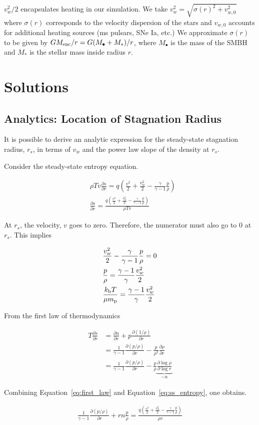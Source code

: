\documentclass[usenatbib,fleqn]{mn2e}
\newcommand{\rs}{r_s}
\newcommand{\dxdy}[2]{\frac{\partial #1}{\partial #2} }
\newcommand{\ddr}[1]{\dxdy{#1}{r}}
\newcommand{\dsdr}{\dxdy{s}{r}}
\newcommand{\ke}{\frac{v^2}{2}}
\newcommand{\kew}{\frac{v_w^2}{2}}
\newcommand{\gammaf}{\frac{\gamma}{\gamma-1}}
\newcommand{\gammafi}{\frac{\gamma-1}{\gamma}}
\newcommand{\cs}{\frac{p}{\rho}}
\newcommand{\Q}{q (\ke+\kew-\gammaf \cs)}
\newcommand{\kb}{k_{\rm b}}
\renewcommand{\mp}{m_{\rm p}}
\newcommand{\Menc}{M_{\rm enc}}
\newcommand{\Mstar}{M_{*}}
\newcommand{\Mbh}[1][]{M_{\bullet#1}}
\begin{document}
$v_w^2/2$ encapsulates heating in our simulation. We take $v_w^2=\sqrt{\sigma(r)^2+v_{w,0}^2}$ where $\sigma(r)$ corresponds to the velocity dispersion of the stars and $v_{w,0}$ accounts for additional heating sources (ms pulsars, SNe Ia, etc.)  We approximate $\sigma(r)$ to be given by $G \Menc/r=G(\Mbh+\Mstar)/r$, where $\Mbh$ is the mass of the SMBH and $\Mstar$ is the stellar mass inside radius $r$. 

\section{Solutions}
\subsection{Analytics: Location of Stagnation Radius}
It is possible to derive an analytic expression for the steady-state stagnation radius, $\rs$, in terms of $v_w$ and the power law slope of the density at $\rs$.

Consider the steady-state entropy equation.

\begin{align}
&\rho T v \dsdr=\Q\\
&\dsdr=\frac{\Q}{\rho T v} \label{eq:ss_entropy}
\end{align}

At $\rs$, the velocity, $v$ goes to zero.  Therefore, the numerator must also go to 0 at $\rs$. This implies 

\begin{align}
 &\kew-\gammaf \cs=0\\
 &\cs=\gammafi \kew\\
 &\frac{\kb T}{\mu \mp}=\gammafi \kew \label{eq:tstag}
\end{align}

From the first law of thermodynamics 

\begin{align}
T\dsdr&=\ddr{u}+p\ddr{(1/\rho)}\\
&=\frac{1}{\gamma-1}\ddr{(p/\rho)}-\frac{p}{\rho^2}\ddr{\rho}\\
&=\frac{1}{\gamma-1}\ddr{(p/\rho)}-\frac{p}{\rho} \underbrace{\dxdy{\log{\rho}}{\log{r}}}_{-n} \label{eq:first_law}
\end{align}

Combining Equation~\ref{eq:first_law} and Equation~\ref{eq:ss_entropy}, one obtains.

\begin{align}
\frac{1}{\gamma-1}\ddr{(p/\rho)}+r n \cs=\frac{\Q}{\rho  v} \label{eqn:combo1}
\end{align}
\end{document}
